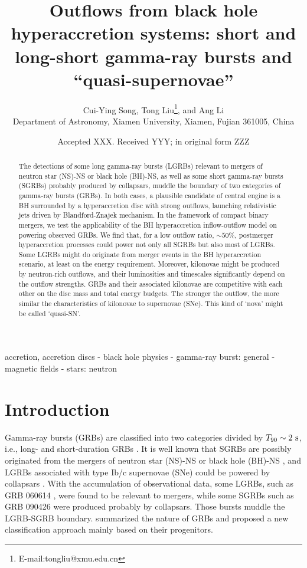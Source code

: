 \documentclass[a4paper,fleqn,usenatbib]{mnras}
\title[Outflows from black hole hyperaccretion systems]
{Outflows from black hole hyperaccretion systems: short and long-short gamma-ray bursts and ``quasi-supernovae''}
\author[Song et al.]{Cui-Ying Song, Tong Liu\thanks{E-mail:tongliu@xmu.edu.cn}, and Ang Li \\
Department of Astronomy, Xiamen University, Xiamen, Fujian 361005, China}
\date{Accepted XXX. Received YYY; in original form ZZZ}
\begin{document}
\label{firstpage}
\pagerange{\pageref{firstpage}--\pageref{lastpage}}
\maketitle

\begin{abstract}
The detections of some long gamma-ray bursts (LGRBs) relevant to mergers of neutron star (NS)-NS or black hole (BH)-NS, as well as some short gamma-ray bursts (SGRBs) probably produced by collapsars, muddle the boundary of two categories of gamma-ray bursts (GRBs). In both cases, a plausible candidate of central engine is a BH surrounded by a hyperaccretion disc with strong outflows, launching relativistic jets driven by Blandford-Znajek mechanism. In the framework of compact binary mergers, we test the applicability of the BH hyperaccretion inflow-outflow model on powering observed GRBs. We find that, for a low outflow ratio, $\sim 50\%$, postmerger hyperaccretion processes could power not only all SGRBs but also most of LGRBs. Some LGRBs might do originate from merger events in the BH hyperaccretion scenario, at least on the energy requirement. Moreover, kilonovae might be produced by neutron-rich outflows, and their luminosities and timescales significantly depend on the outflow strengths. GRBs and their associated kilonovae are competitive with each other on the disc mass and total energy budgets. The stronger the outflow, the more similar the characteristics of kilonovae to supernovae (SNe). This kind of `nova' might be called `quasi-SN'.
\end{abstract}

\begin{keywords}
accretion, accretion discs - black hole physics - gamma-ray burst: general - magnetic fields - stars: neutron
\end{keywords}


\section{Introduction}\label{sec:intro}

Gamma-ray bursts (GRBs) are classified into two categories divided by $T_{90}\sim 2 ~\rm s$, i.e., long- and short-duration GRBs \citep[LGRBs and SGRBs, see e.g.,][]{Kouveliotou1993}. It is well known that SGRBs are possibly originated from the mergers of neutron star (NS)-NS or black hole (BH)-NS \citep[e.g.,][]{Paczynski1986,Eichler1989,Paczynski1991,Popham1999,Narayan1992,Berger2014}, and LGRBs associated with type Ib/c supernovae (SNe) could be powered by collapsars \citep[e.g.,][]{Tutukov1992,Galama1998,Hjorth2003,Stanek2003,Woosley2006,Campana2006,Fruchter2006,Kumar2015}. With the accumulation of observational data, some LGRBs, such as GRB 060614 \citep[e.g.,][]{Gehrels2006,Zhang2007b,Zhang2009}, were found to be relevant to mergers, while some SGRBs such as GRB 090426 \citep[e.g.,][]{Antonelli2009,Levesque2010,Xin2011} were produced probably by collapsars. Those bursts muddle the LGRB-SGRB boundary. \citet{Zhang2009} summarized the nature of GRBs and proposed a new classification approach mainly based on their progenitors.
\end{document}
